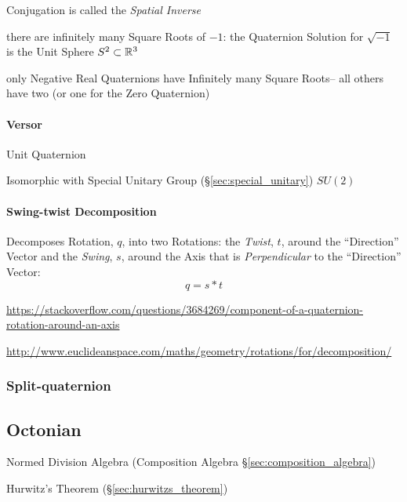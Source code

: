 Conjugation is called the \emph{Spatial Inverse}

there are infinitely many Square Roots of $-1$: the Quaternion Solution for
$\sqrt{-1}$ is the Unit Sphere $S^2 \subset \mathbb{R}^3$

only Negative Real Quaternions have Infinitely many Square Roots-- all others
have two (or one for the Zero Quaternion)



\paragraph{Versor}\label{sec:versor}

Unit Quaternion

Isomorphic with Special Unitary Group (\S\ref{sec:special_unitary}) $SU(2)$



\paragraph{Swing-twist Decomposition}\label{sec:swing_twist}

Decomposes Rotation, $q$, into two Rotations: the \emph{Twist}, $t$, around the
``Direction'' Vector and the \emph{Swing}, $s$, around the Axis that is
\emph{Perpendicular} to the ``Direction'' Vector:
\[
  q = s * t
\]

\url{https://stackoverflow.com/questions/3684269/component-of-a-quaternion-rotation-around-an-axis}

\url{http://www.euclideanspace.com/maths/geometry/rotations/for/decomposition/}



\subsubsection{Split-quaternion}\label{sec:split_quaternion}



\subsection{Octonian}\label{sec:octonian}

Normed Division Algebra (Composition Algebra \S\ref{sec:composition_algebra})

Hurwitz's Theorem (\S\ref{sec:hurwitzs_theorem})



